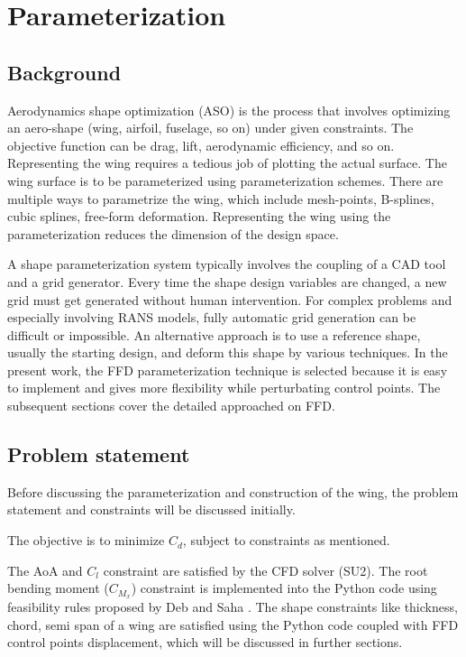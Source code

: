 \chapter{Parameterization}
\label{parameterization}
\section{Background}
Aerodynamics shape optimization (ASO) is the process that involves optimizing an aero-shape (wing, airfoil, fuselage, so on) under given constraints. The objective function can be drag, lift, aerodynamic efficiency, and so on. Representing the wing requires a tedious job of plotting the actual surface. The wing surface is to be parameterized using parameterization schemes. There are multiple ways to parametrize the wing, which include mesh-points, B-splines, cubic splines, free-form deformation. Representing the wing using the parameterization reduces the dimension of the design space. 

A shape parameterization system typically involves the coupling of a CAD tool and a grid generator. Every time the shape design variables are changed, a new grid must get generated without human intervention. For complex problems and especially involving RANS models, fully automatic grid generation can be difficult or impossible. An alternative approach is to use a reference shape, usually the starting design, and deform this shape by various techniques. In the present work, the FFD parameterization technique is selected because it is easy to implement and gives more flexibility while perturbating control points. The subsequent sections cover the detailed approached on FFD.

\section{Problem statement}
Before discussing the parameterization and construction of the wing, the problem statement and constraints will be discussed initially.

The objective is to minimize $C_d$, subject to constraints as mentioned.


The AoA and $C_l$ constraint are satisfied by the CFD solver (SU2). The root bending moment ($C_{M_x}$) constraint is implemented into the Python code using feasibility rules proposed by Deb and Saha \cite{Deb}. The shape constraints like thickness, chord, semi span of a wing are satisfied using the Python code coupled with FFD control points displacement, which will be discussed in further sections.

